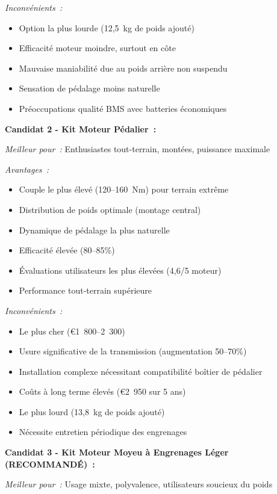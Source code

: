 \documentclass[12pt,a4paper]{article}
\begin{document}
\textit{Inconvénients~:}
\begin{itemize}
    \item Option la plus lourde (12,5~kg de poids ajouté)
    \item Efficacité moteur moindre, surtout en côte
    \item Mauvaise maniabilité due au poids arrière non suspendu
    \item Sensation de pédalage moins naturelle
    \item Préoccupations qualité BMS avec batteries économiques
\end{itemize}

\textbf{Candidat 2 - Kit Moteur Pédalier~:}

\textit{Meilleur pour~:} Enthusiastes tout-terrain, montées, puissance maximale

\textit{Avantages~:}
\begin{itemize}
    \item Couple le plus élevé (120--160~Nm) pour terrain extrême
    \item Distribution de poids optimale (montage central)
    \item Dynamique de pédalage la plus naturelle
    \item Efficacité élevée (80--85\%)
    \item Évaluations utilisateurs les plus élevées (4,6/5 moteur)
    \item Performance tout-terrain supérieure
\end{itemize}

\textit{Inconvénients~:}
\begin{itemize}
    \item Le plus cher (€1~800--2~300)
    \item Usure significative de la transmission (augmentation 50--70\%)
    \item Installation complexe nécessitant compatibilité boîtier de pédalier
    \item Coûts à long terme élevés (€2~950 sur 5 ans)
    \item Le plus lourd (13,8~kg de poids ajouté)
    \item Nécessite entretien périodique des engrenages
\end{itemize}

\textbf{Candidat 3 - Kit Moteur Moyeu à Engrenages Léger (RECOMMANDÉ)~:}

\textit{Meilleur pour~:} Usage mixte, polyvalence, utilisateurs soucieux du poids
\end{document}
